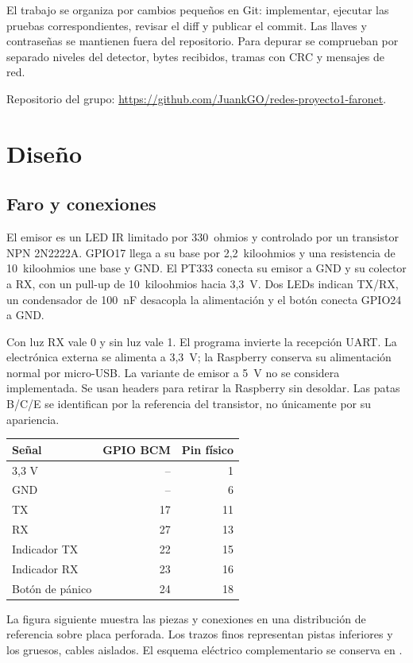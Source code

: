 \documentclass[11pt,letterpaper]{article}
\begin{document}
El trabajo se organiza por cambios pequeños en Git: implementar, ejecutar las
pruebas correspondientes, revisar el diff y publicar el commit. Las llaves y
contraseñas se mantienen fuera del repositorio. Para depurar se comprueban por
separado niveles del detector, bytes recibidos, tramas con CRC y mensajes de red.

Repositorio del grupo:
\url{https://github.com/JuankGO/redes-proyecto1-faronet}.

\section{Diseño}

\subsection{Faro y conexiones}

El emisor es un LED IR limitado por 330~ohmios y controlado por un transistor
NPN 2N2222A. GPIO17 llega a su base por 2,2~kiloohmios y una resistencia de
10~kiloohmios une base y GND. El PT333 conecta su emisor a GND y su colector a
RX, con un pull-up de 10~kiloohmios hacia 3,3~V. Dos LEDs indican TX/RX, un
condensador de 100~nF desacopla la alimentación y el botón conecta GPIO24 a GND.

Con luz RX vale 0 y sin luz vale 1. El programa invierte la recepción UART.
La electrónica externa se alimenta a 3,3~V; la Raspberry conserva su alimentación
normal por micro-USB. La variante de emisor a 5~V no se considera implementada.
Se usan headers para retirar la Raspberry sin desoldar. Las patas B/C/E se
identifican por la referencia del transistor, no únicamente por su apariencia.

\begin{center}
\begin{minipage}[t]{0.49\linewidth}
\vspace{0pt}\small
\begin{tabular}{lrr}
\toprule
Señal & GPIO BCM & Pin físico\\
\midrule
3,3 V & -- & 1\\
GND & -- & 6\\
TX & 17 & 11\\
RX & 27 & 13\\
Indicador TX & 22 & 15\\
Indicador RX & 23 & 16\\
Botón de pánico & 24 & 18\\
\bottomrule
\end{tabular}
\end{minipage}\hfill
\begin{minipage}[t]{0.47\linewidth}
\vspace{0pt}\small\raggedright
La figura siguiente muestra las piezas y conexiones en una distribución de
referencia sobre placa perforada. Los trazos finos representan pistas inferiores
y los gruesos, cables aislados. El esquema eléctrico complementario se conserva
en .
\end{minipage}
\end{center}
\end{document}
